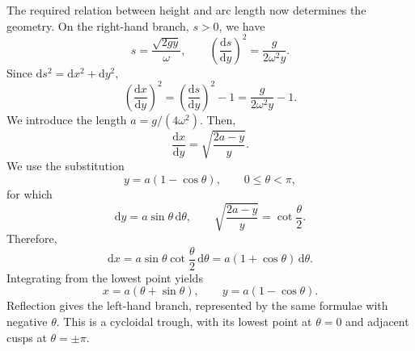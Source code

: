 \begin{problem}[title={Tautochrone: period independent of amplitude}]
{The required relation between height and arc length now determines the geometry. On the right-hand branch, $s > 0$, we have
\begin{equation*}
    s = \frac{\sqrt{2gy}}{\omega}, \qquad \left(\frac{\mathrm{d}s}{\mathrm{d}y}\right)^2 = \frac{g}{2\omega^2y}.
\end{equation*}
Since $\mathrm{d}s^2 = \mathrm{d}x^2 + \mathrm{d}y^2$,
\begin{equation*}
    \left(\frac{\mathrm{d}x}{\mathrm{d}y}\right)^2 = \left(\frac{\mathrm{d}s}{\mathrm{d}y}\right)^2 - 1 = \frac{g}{2\omega^2y} - 1.
\end{equation*}
We introduce the length $a = g/(4\omega^2)$. Then,
\begin{equation*}
    \frac{\mathrm{d}x}{\mathrm{d}y} = \sqrt{\frac{2a - y}{y}}.
\end{equation*}
We use the substitution
\begin{equation*}
    y = a(1 - \cos{\theta}), \qquad 0 \leq \theta < \pi,
\end{equation*}
for which
\begin{equation*}
    \mathrm{d}y = a\sin{\theta}\,\mathrm{d}\theta, \qquad \sqrt{\frac{2a - y}{y}} = \cot{\frac{\theta}{2}}.
\end{equation*}
Therefore,
\begin{equation*}
    \mathrm{d}x = a\sin{\theta}\cot{\frac{\theta}{2}}\,\mathrm{d}\theta = a(1 + \cos{\theta})\,\mathrm{d}\theta.
\end{equation*}
Integrating from the lowest point yields
\begin{equation*}
    x = a(\theta + \sin{\theta}), \qquad y = a(1 - \cos{\theta}).
\end{equation*}
Reflection gives the left-hand branch, represented by the same formulae with negative $\theta$. This is a cycloidal trough, with its lowest point at $\theta = 0$ and adjacent cusps at $\theta = \pm\pi$.

}
\end{problem}
